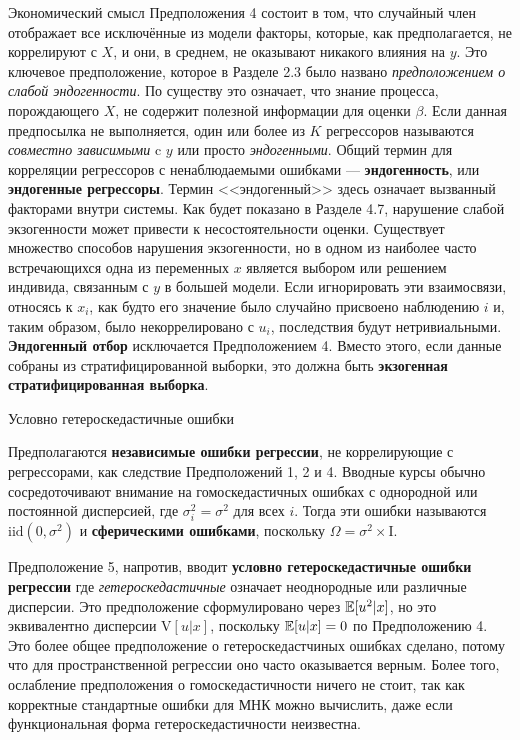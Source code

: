 Экономический смысл Предположения 4 состоит в том, что случайный член отображает все исключённые из модели факторы, которые, как предполагается, не коррелируют с $X$, и они, в среднем, не оказывают никакого влияния на $y$. Это ключевое предположение, которое в Разделе 2.3 было названо \textit{предположением о слабой эндогенности}. По существу это означает, что знание процесса, порождающего $X$, не содержит полезной информации для оценки $\beta$. Если данная предпосылка не выполняется, один или более из $K$ регрессоров называются \textit{совместно зависимыми} c $y$ или просто \textit{эндогенными}. Общий термин для корреляции регрессоров с ненаблюдаемыми ошибками --- \textbf{эндогенность}, или \textbf{эндогенные регрессоры}.  Термин <<эндогенный>> здесь означает вызванный факторами внутри системы. Как будет показано в Разделе 4.7, нарушение слабой экзогенности может привести к несостоятельности оценки. Существует множество способов нарушения экзогенности, но в одном из наиболее часто встречающихся одна из переменных $x$ является выбором или решением индивида, связанным с $y$ в большей модели. Если игнорировать эти взаимосвязи, относясь к $x_i$, как будто его значение было случайно присвоено наблюдению $i$ и, таким образом, было некоррелировано с $u_i$, последствия будут нетривиальными. \textbf{Эндогенный отбор} исключается Предположением 4. Вместо этого, если данные собраны из стратифицированной выборки, это должна быть \textbf{экзогенная стратифицированная выборка}.

\begin{center}
  Условно гетероскедастичные ошибки
\end{center}  

Предполагаются \textbf{независимые ошибки регрессии}, не коррелирующие с регрессорами, как следствие Предположений 1, 2 и 4. Вводные курсы обычно сосредоточивают внимание на гомоскедастичных ошибках с однородной или постоянной дисперсией, где $\sigma_i^2 = \sigma^2$ для всех $i$. Тогда эти ошибки называются $\mathrm{iid} (0,\sigma^2)$ и \textbf{сферическими ошибками}, поскольку $\Omega = \sigma^2 \times \mathrm{I}$.

Предположение 5, напротив, вводит \textbf{условно гетероскедастичные ошибки регрессии} где \textit{гетероскедастичные} означает неоднородные или различные дисперсии. Это предположение сформулировано через $\mathbb{E}[u^2|x]$, но это эквивалентно дисперсии $\mathrm{V}[u|x]$, поскольку $\mathbb{E}[u|x]=0$ по Предположению 4. Это более общее предположение о гетероскедастчиных ошибках сделано, потому что для пространственной регрессии оно часто оказывается верным. Более того, ослабление предположения о гомоскедастичности ничего не стоит, так как корректные стандартные ошибки для МНК можно вычислить, даже если функциональная форма гетероскедастичности неизвестна.

